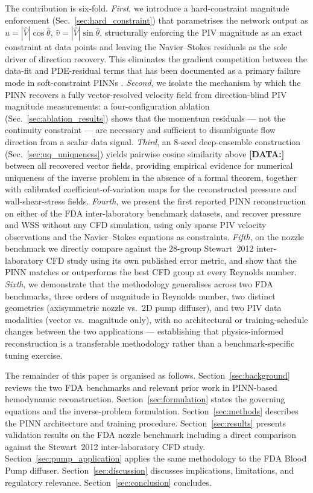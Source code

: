 \documentclass[12pt,a4paper]{article}
\newcommand{\DATA}[1]{{\color{orange}\textbf{[DATA:\;#1]}}}
\begin{document}
The contribution is six-fold.
\emph{First}, we introduce a hard-constraint magnitude
enforcement (Sec.~\ref{sec:hard_constraint}) that parametrises
the network output as
$\hat{u} = |\hat{V}|\cos\hat{\theta}$,
$\hat{v} = |\hat{V}|\sin\hat{\theta}$, structurally enforcing
the PIV magnitude as an exact constraint at data points and
leaving the Navier--Stokes residuals as the sole driver of
direction recovery. This eliminates the gradient competition
between the data-fit and PDE-residual terms that has been
documented as a primary failure mode in soft-constraint PINNs
\cite{Wang2021GradientPath}.
\emph{Second}, we isolate the mechanism by which the PINN
recovers a fully vector-resolved velocity field from
direction-blind PIV magnitude measurements: a
four-configuration ablation
(Sec.~\ref{sec:ablation_results}) shows that the momentum
residuals --- not the continuity constraint --- are necessary
and sufficient to disambiguate flow direction from a scalar
data signal. \emph{Third}, an $8$-seed deep-ensemble
construction (Sec.~\ref{sec:uq_uniqueness}) yields pairwise
cosine similarity above \DATA{[intro.cossim-min]} between all
recovered vector fields, providing empirical evidence for
numerical uniqueness of the inverse problem in the absence of
a formal theorem, together with calibrated coefficient-of-variation
maps for the reconstructed pressure and wall-shear-stress fields.
\emph{Fourth}, we present the first reported PINN reconstruction
on either of the FDA inter-laboratory benchmark datasets, and
recover pressure and WSS without any CFD simulation, using only
sparse PIV velocity observations and the Navier--Stokes
equations as constraints. \emph{Fifth}, on the nozzle benchmark
we directly compare against the 28-group Stewart~2012
inter-laboratory CFD study using its own published error metric,
and show that the PINN matches or outperforms the best CFD
group at every Reynolds number. \emph{Sixth}, we demonstrate that
the methodology generalises across two FDA benchmarks, three
orders of magnitude in Reynolds number, two distinct geometries
(axisymmetric nozzle vs.\ 2D pump diffuser), and two PIV data
modalities (vector vs.\ magnitude only), with no architectural
or training-schedule changes between the two applications ---
establishing that physics-informed reconstruction is a
transferable methodology rather than a benchmark-specific
tuning exercise.

The remainder of this paper is organised as follows.
Section~\ref{sec:background} reviews the two FDA benchmarks
and relevant prior work in PINN-based hemodynamic
reconstruction. Section~\ref{sec:formulation} states the
governing equations and the inverse-problem formulation.
Section~\ref{sec:methods} describes the PINN architecture
and training procedure. Section~\ref{sec:results} presents
validation results on the FDA nozzle benchmark including a
direct comparison against the Stewart~2012 inter-laboratory CFD
study. Section~\ref{sec:pump_application} applies the same
methodology to the FDA Blood Pump diffuser. Section~\ref{sec:discussion}
discusses implications, limitations, and regulatory relevance.
Section~\ref{sec:conclusion} concludes.
\end{document}
